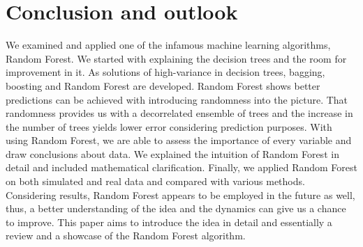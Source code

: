 \section{Conclusion and outlook}

We examined and applied one of the infamous machine learning algorithms, Random Forest. 
We started with explaining the decision trees and the room for improvement in it. 
As solutions of high-variance in decision trees, bagging, boosting and Random Forest are developed. 
Random Forest shows better predictions can be achieved with introducing randomness into the picture.
That randomness provides us with a decorrelated ensemble of trees and 
the increase in the number of trees yields lower error considering prediction purposes.
With using Random Forest, we are able to assess the importance of every variable and draw conclusions about data.
We explained the intuition of Random Forest in detail and included mathematical clarification. 
Finally, we applied Random Forest on both simulated and real data and compared with various methods. 
Considering results, Random Forest appears to be employed in the future as well, 
thus, a better understanding of the idea and the dynamics can give us a chance to improve. 
This paper aims to introduce the idea in detail and essentially a review and a showcase of the Random Forest algorithm. 